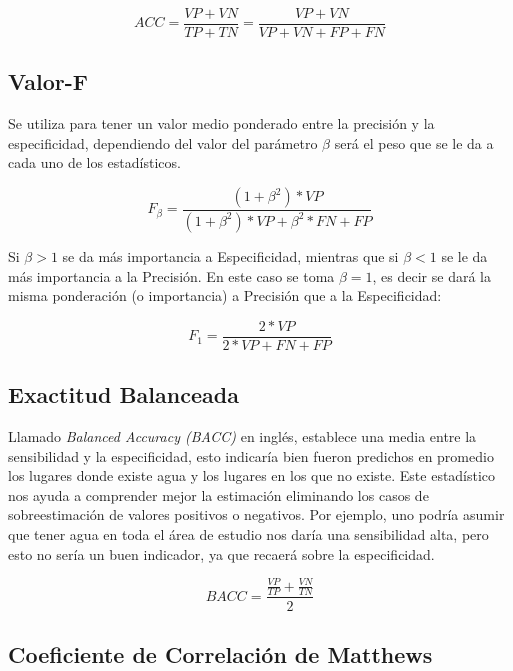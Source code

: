 \documentclass[10pt,a4paper, twoside]{report}
\begin{document}
\begin{equation}
ACC=\frac{VP+VN}{TP+TN}=\frac{VP+VN}{VP+VN+FP+FN}
\end{equation}

\subsection{Valor-F}
    
Se utiliza para tener un valor medio ponderado entre la precisión y la especificidad, dependiendo del  valor del parámetro $\beta$ será el peso que se le da a cada uno de los estadísticos.

\begin{equation}
F_{\beta}=\frac{(1+\beta^{2})*VP}{(1+\beta^{2})*VP + \beta^{2}*FN + FP }
\end{equation}

Si $\beta > 1$ se da más importancia a Especificidad, mientras que si $\beta < 1$ se le da más importancia a la Precisión. 
En este caso se toma $\beta = 1$, es decir se dará la misma ponderación (o importancia) a Precisión que a la Especificidad:

\begin{equation}
F_{1}=\frac{2*VP}{2 * VP + FN + FP }
\end{equation}

\subsection{Exactitud Balanceada}

Llamado\textit{ Balanced Accuracy (BACC)} en inglés, establece una media entre la sensibilidad y la especificidad, esto indicaría bien fueron predichos en promedio los lugares donde existe agua y los lugares en los que no existe. Este estadístico nos ayuda a comprender mejor la estimación eliminando los casos de sobreestimación de valores positivos o negativos. Por ejemplo, uno podría asumir que tener agua en toda el área de estudio nos daría una sensibilidad alta, pero esto no sería un buen indicador, ya que recaerá sobre la especificidad.

\begin{equation}
BACC=\frac{\frac{VP}{TP}+\frac{VN}{TN}}{2}
\end{equation}


\subsection{Coeficiente de Correlación de Matthews}
\label{defMatthews}
\end{document}
